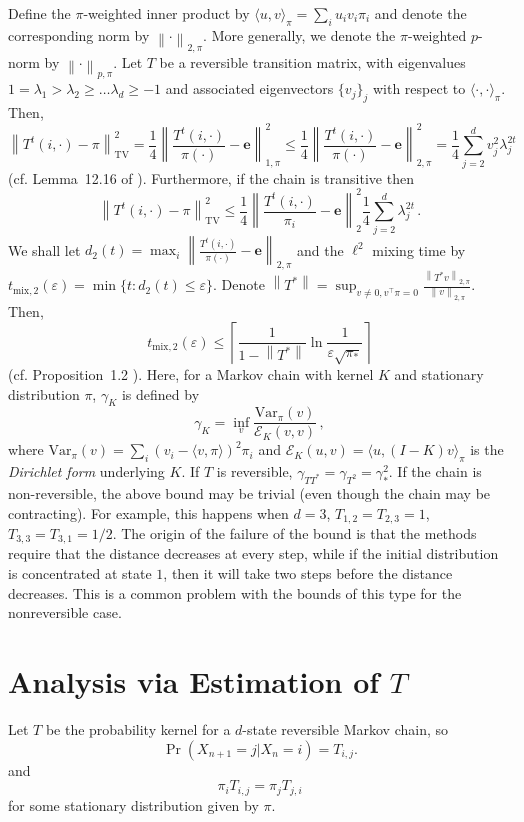 \documentclass[11pt]{article}
\newcommand{\ceil}[1]{\left \lceil {#1} \right\rceil}
\newcommand{\eps}{\varepsilon}
\theoremstyle{plain}
\theoremstyle{definition}
\theoremstyle{remark}
\newcommand\norm[1]{\left\| #1 \right\|}
\newcommand\tvnorm[1]{\left\| #1 \right\|_{\mathrm{TV}}}
\newcommand\be{\ensuremath{\mathbf{e}}}
\newcommand{\ip}[1]{\langle#1\rangle}
\newcommand{\DF}{\mathcal{E}}
\newcommand\ttmix{\ensuremath{t_{\mathrm{mix},2}}}
\begin{document}
Define the $\pi$-weighted inner product by $\ip{u,v}_{\pi} = \sum_i u_i v_i \pi_i$ and denote the corresponding norm by $\norm{\cdot}_{2,\pi}$. More generally, we denote the $\pi$-weighted $p$-norm by $\norm{\cdot}_{p,\pi}$.
Let $T$ be a reversible transition matrix, with eigenvalues $1 = \lambda_1 > \lambda_2 \ge \ldots \lambda_d \ge -1$ and associated eigenvectors $\{v_j\}_j$ with respect to $\ip{\cdot,\cdot}_\pi$. Then,
\[
\tvnorm{ T^t(i,\cdot) - \pi}^2 
= \frac14  \norm{\frac{T^t(i,\cdot)}{\pi(\cdot)} - \be }_{1,\pi}^2  
\le \frac14  \norm{\frac{T^t(i,\cdot)}{\pi(\cdot)} - \be }_{2,\pi}^2
= \frac14 \sum_{j=2}^d v_j^2 \lambda_j^{2t}\,
\]
(cf. Lemma~12.16 of \citet{LePeWi08}).
Furthermore, if the chain is transitive then 
\[
\tvnorm{ T^t(i,\cdot) - \pi}^2 \le \frac14  \norm{\frac{T^t(i,\cdot)}{\pi_i} - \be }_2^2 \frac14 \sum_{j=2}^d \lambda_j^{2t}\,.
\]
\fi
We shall let $d_2(t) =  \max_i \norm{\frac{T^t(i,\cdot)}{\pi(\cdot)} - \be }_{2,\pi}$ and the $\ell^2$ mixing time by $\ttmix(\eps) = \min\{ t: d_2(t)\le \eps\}$.
Denote $\norm{T^*} = \sup_{v\ne 0, v^\top \pi = 0} \frac{\norm{T^* v}_{2,\pi}}{\norm{v}_{2,\pi}}$.
Then, 
\[
\ttmix(\eps) \le \ceil{ \frac{1}{1-\norm{T^*}} \ln \frac{1}{\eps\sqrt{\pi_*}}} 
\]
(cf. Proposition~1.2 \citet{MoTe06}). 
Here, for a Markov chain with kernel $K$ and stationary distribution $\pi$,
 $\gamma_{K}$ is defined by
\[
\gamma_{K} = \inf_v \frac{\mathrm{Var}_\pi(v)}{\DF_K(v,v)}\,,
\]
where $\mathrm{Var}_\pi(v) = \sum_i (v_i - \ip{v,\pi})^2 \pi_i$ and
$\DF_K(u,v) = \ip{ u, (I-K)v }_\pi$ is the \emph{Dirichlet form} underlying $K$.
If $T$ is reversible, $\gamma_{T T^*} =\gamma_{T^2} = \gamma_*^2$.
\fi
If the chain is non-reversible, the above bound may be trivial (even though the chain may be contracting). For example, this happens when $d = 3$, $T_{1,2} = T_{2,3} = 1$, $T_{3,3} = T_{3,1} = 1/2$. The origin of the failure of the bound is that the methods require that the distance decreases at every step, while if the initial distribution is concentrated at state $1$, then it will take two steps before the distance decreases. This is a common problem with the bounds of this type for the nonreversible case.

\section{Analysis via Estimation of $T$}

Let $T$ be the probability kernel for a $d$-state reversible Markov
chain, so
\[ \Pr(X_{n+1} = j | X_n = i) = T_{i,j} . \]
and
\[
  \pi_i T_{i,j} = \pi_j T_{j,i}
\]
for some stationary distribution given by $\pi$.
\end{document}
